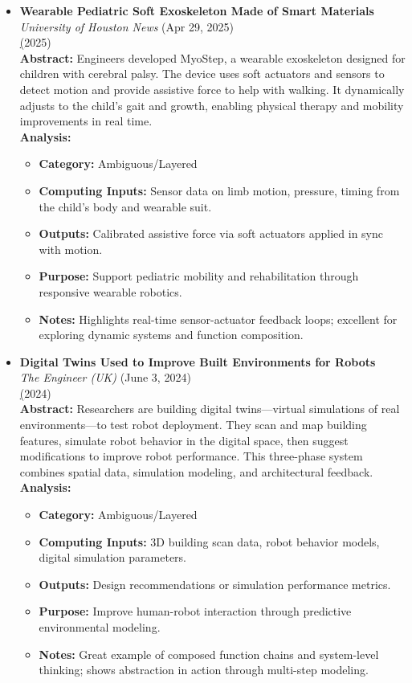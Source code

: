 \documentclass[11pt]{article}
\begin{document}
\begin{itemize}
\item \textbf{Wearable Pediatric Soft Exoskeleton Made of Smart Materials} \\
\textit{University of Houston News} (Apr 29, 2025)\\
\href{https://technews.acm.org/archives.cfm?fo=2025-04-apr#41} (2025)\\
\textbf{Abstract:} Engineers developed MyoStep, a wearable exoskeleton designed for children with cerebral palsy. The device uses soft actuators and sensors to detect motion and provide assistive force to help with walking. It dynamically adjusts to the child’s gait and growth, enabling physical therapy and mobility improvements in real time.\\
\textbf{Analysis:}\\
\begin{itemize}
\item \textbf{Category:} Ambiguous/Layered
\item \textbf{Computing Inputs:} Sensor data on limb motion, pressure, timing from the child’s body and wearable suit.
\item \textbf{Outputs:} Calibrated assistive force via soft actuators applied in sync with motion.
\item \textbf{Purpose:} Support pediatric mobility and rehabilitation through responsive wearable robotics.
\item \textbf{Notes:} Highlights real-time sensor-actuator feedback loops; excellent for exploring dynamic systems and function composition.
\end{itemize}

\item \textbf{Digital Twins Used to Improve Built Environments for Robots} \\
\textit{The Engineer (UK)} (June 3, 2024)\\
\href{https://technews.acm.org/archives.cfm?fo=2024-06-jun#48} (2024)\\
\textbf{Abstract:} Researchers are building digital twins—virtual simulations of real environments—to test robot deployment. They scan and map building features, simulate robot behavior in the digital space, then suggest modifications to improve robot performance. This three-phase system combines spatial data, simulation modeling, and architectural feedback.\\
\textbf{Analysis:}\\
\begin{itemize}
\item \textbf{Category:} Ambiguous/Layered
\item \textbf{Computing Inputs:} 3D building scan data, robot behavior models, digital simulation parameters.
\item \textbf{Outputs:} Design recommendations or simulation performance metrics.
\item \textbf{Purpose:} Improve human-robot interaction through predictive environmental modeling.
\item \textbf{Notes:} Great example of composed function chains and system-level thinking; shows abstraction in action through multi-step modeling.
\end{itemize}
\end{itemize}
\end{document}

